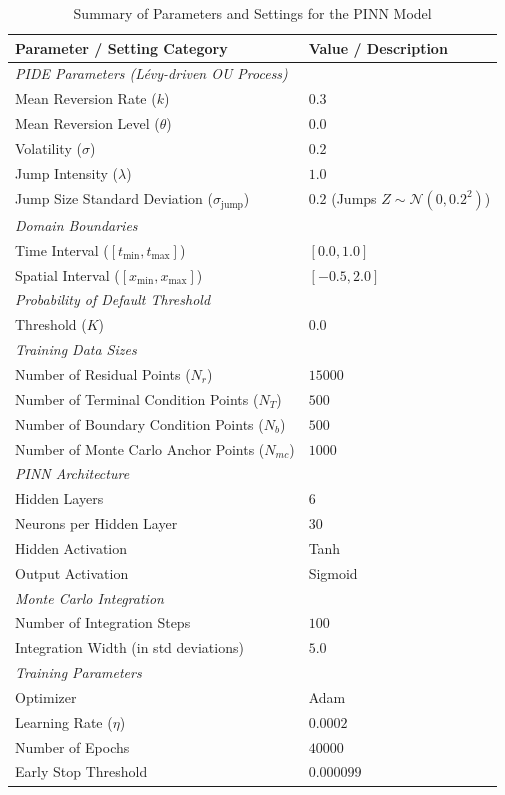\documentclass[11pt,twoside,openright]{report}
\begin{document}
\begin{table}[htbp] %
\centering
\caption{Summary of Parameters and Settings for the PINN Model}
\label{tab:parameters_summary}
\begin{tabular}{ll}
\toprule
\textbf{Parameter / Setting Category} & \textbf{Value / Description} \\
\midrule
\multicolumn{2}{l}{\textit{PIDE Parameters (Lévy-driven OU Process)}} \\
\quad Mean Reversion Rate ($k$) & $0.3$ \\
\quad Mean Reversion Level ($\theta$) & $0.0$ \\
\quad Volatility ($\sigma$) & $0.2$ \\
\quad Jump Intensity ($\lambda$) & $1.0$ \\
\quad Jump Size Standard Deviation ($\sigma_{\text{jump}}$) & $0.2$ (Jumps $Z \sim \mathcal{N}(0, 0.2^2)$) \\
\midrule
\multicolumn{2}{l}{\textit{Domain Boundaries}} \\
\quad Time Interval ($[t_{\text{min}}, t_{\text{max}}]$) & $[0.0, 1.0]$ \\
\quad Spatial Interval ($[x_{\text{min}}, x_{\text{max}}]$) & $[-0.5, 2.0]$ \\
\midrule
\multicolumn{2}{l}{\textit{Probability of Default Threshold}} \\
\quad Threshold ($K$) & $0.0$ \\
\midrule
\multicolumn{2}{l}{\textit{Training Data Sizes}} \\
\quad Number of Residual Points ($N_r$) & $15000$ \\
\quad Number of Terminal Condition Points ($N_T$) & $500$ \\
\quad Number of Boundary Condition Points ($N_b$) & $500$ \\
\quad Number of Monte Carlo Anchor Points ($N_{mc}$) & $1000$ \\
\midrule
\multicolumn{2}{l}{\textit{PINN Architecture}} \\
\quad Hidden Layers & 6 \\
\quad Neurons per Hidden Layer & 30 \\
\quad Hidden Activation & Tanh \\
\quad Output Activation & Sigmoid \\
\midrule
\multicolumn{2}{l}{\textit{Monte Carlo Integration}} \\
\quad Number of Integration Steps & $100$ \\
\quad Integration Width (in std deviations) & $5.0$ \\
\midrule
\multicolumn{2}{l}{\textit{Training Parameters}} \\
\quad Optimizer & Adam \\
\quad Learning Rate ($\eta$) & $0.0002$ \\
\quad Number of Epochs & $40000$ \\
\quad Early Stop Threshold & $0.000099$ \\
\bottomrule
\end{tabular}
\end{table}
\end{document}
